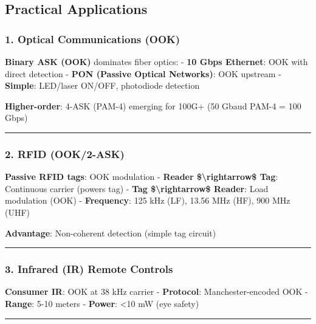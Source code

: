 \subsection{Practical Applications}\label{practical-applications}

\subsubsection{1. Optical Communications
(OOK)}\label{optical-communications-ook}

\textbf{Binary ASK (OOK)} dominates fiber optics: - \textbf{10 Gbps
Ethernet}: OOK with direct detection - \textbf{PON (Passive Optical
Networks)}: OOK upstream - \textbf{Simple}: LED/laser ON/OFF, photodiode
detection

\textbf{Higher-order}: 4-ASK (PAM-4) emerging for 100G+ (50 Gbaud PAM-4
= 100 Gbps)

\begin{center}\rule{0.5\linewidth}{0.5pt}\end{center}

\subsubsection{2. RFID (OOK/2-ASK)}\label{rfid-ook2-ask}

\textbf{Passive RFID tags}: OOK modulation - \textbf{Reader
\$\textbackslash rightarrow\$ Tag}: Continuous carrier (powers tag) -
\textbf{Tag \$\textbackslash rightarrow\$ Reader}: Load modulation (OOK)
- \textbf{Frequency}: 125 kHz (LF), 13.56 MHz (HF), 900 MHz (UHF)

\textbf{Advantage}: Non-coherent detection (simple tag circuit)

\begin{center}\rule{0.5\linewidth}{0.5pt}\end{center}

\subsubsection{3. Infrared (IR) Remote
Controls}\label{infrared-ir-remote-controls}

\textbf{Consumer IR}: OOK at 38 kHz carrier - \textbf{Protocol}:
Manchester-encoded OOK - \textbf{Range}: 5-10 meters - \textbf{Power}:
\textless10 mW (eye safety)

\begin{center}\rule{0.5\linewidth}{0.5pt}\end{center}

